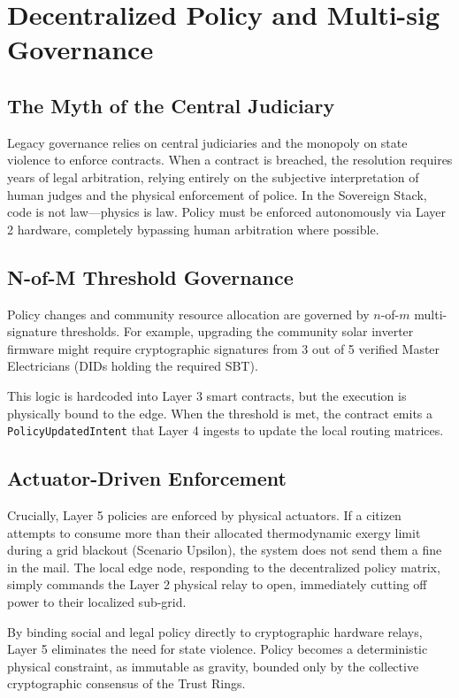 \chapter{Decentralized Policy and Multi-sig Governance}

\section{The Myth of the Central Judiciary}
Legacy governance relies on central judiciaries and the monopoly on state violence to enforce contracts. When a contract is breached, the resolution requires years of legal arbitration, relying entirely on the subjective interpretation of human judges and the physical enforcement of police. In the Sovereign Stack, code is not law—physics is law. Policy must be enforced autonomously via Layer 2 hardware, completely bypassing human arbitration where possible.

\section{N-of-M Threshold Governance}
Policy changes and community resource allocation are governed by $n$-of-$m$ multi-signature thresholds. For example, upgrading the community solar inverter firmware might require cryptographic signatures from 3 out of 5 verified Master Electricians (DIDs holding the required SBT). 

This logic is hardcoded into Layer 3 smart contracts, but the execution is physically bound to the edge. When the threshold is met, the contract emits a \texttt{PolicyUpdatedIntent} that Layer 4 ingests to update the local routing matrices. 

\section{Actuator-Driven Enforcement}
Crucially, Layer 5 policies are enforced by physical actuators. If a citizen attempts to consume more than their allocated thermodynamic exergy limit during a grid blackout (Scenario Upsilon), the system does not send them a fine in the mail. The local edge node, responding to the decentralized policy matrix, simply commands the Layer 2 physical relay to open, immediately cutting off power to their localized sub-grid. 

By binding social and legal policy directly to cryptographic hardware relays, Layer 5 eliminates the need for state violence. Policy becomes a deterministic physical constraint, as immutable as gravity, bounded only by the collective cryptographic consensus of the Trust Rings.

